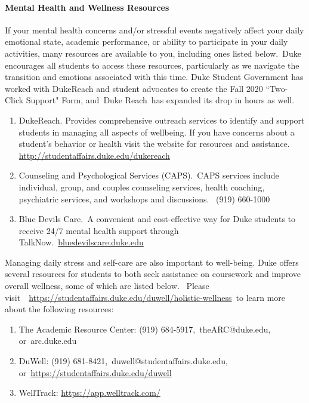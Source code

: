 \documentclass[11pt]{article}
\begin{document}
\paragraph{Mental Health and Wellness Resources}

If your mental health concerns and/or stressful events negatively affect your daily emotional state, academic performance, or ability to participate in your daily activities, many resources are available to you, including ones listed below. Duke encourages all students to access these resources, particularly as we navigate the transition and emotions associated with this time. Duke Student Government has worked with DukeReach and student advocates to create the Fall 2020 ``Two-Click Support" Form, and Duke Reach has expanded its drop in hours as well. 

\begin{enumerate}
\item DukeReach. Provides comprehensive outreach services to identify and support students in managing all aspects of wellbeing. If you have concerns about a student's behavior or health visit the website for resources and assistance. \url{http://studentaffairs.duke.edu/dukereach}
\item Counseling and Psychological Services (CAPS). CAPS services include individual, group, and couples counseling services, health coaching, psychiatric services, and workshops and discussions.  (919) 660-1000
\item Blue Devils Care. A convenient and cost-effective way for Duke students to receive 24/7 mental health support through TalkNow. \url{bluedevilscare.duke.edu}
\end{enumerate}

Managing daily stress and self-care are also important to well-being. Duke offers several resources for students to both seek assistance on coursework and improve overall wellness, some of which are listed below.  Please visit  \url{https://studentaffairs.duke.edu/duwell/holistic-wellness} to learn more about the following resources:


\begin{enumerate}
\item The Academic Resource Center: (919) 684-5917, theARC@duke.edu, or arc.duke.edu
\item DuWell: (919) 681-8421, duwell@studentaffairs.duke.edu, or \url{https://studentaffairs.duke.edu/duwell}
\item WellTrack: \url{https://app.welltrack.com/}
\end{enumerate}
\end{document}
